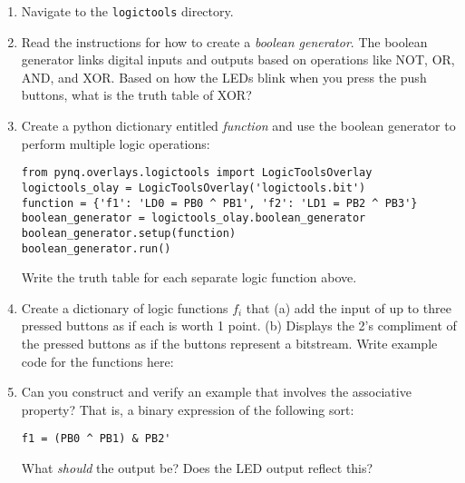 \documentclass{article}
\begin{document}
\begin{enumerate}
\item Navigate to the \verb+logictools+ directory.
\item Read the instructions for how to create a \textit{boolean generator}.  The boolean generator links digital inputs and outputs based on operations like NOT, OR, AND, and XOR.  Based on how the LEDs blink when you press the push buttons, what is the truth table of XOR? \\ \vspace{2cm}
\item Create a python dictionary entitled \textit{function} and use the boolean generator to perform multiple logic operations:
\begin{verbatim}
from pynq.overlays.logictools import LogicToolsOverlay
logictools_olay = LogicToolsOverlay('logictools.bit')
function = {'f1': 'LD0 = PB0 ^ PB1', 'f2': 'LD1 = PB2 ^ PB3'}
boolean_generator = logictools_olay.boolean_generator
boolean_generator.setup(function)
boolean_generator.run()
\end{verbatim}
Write the truth table for each separate logic function above. \\ \vspace{1.5cm}
\item Create a dictionary of logic functions $f_i$ that (a) add the input of up to three pressed buttons as if each is worth 1 point.  (b) Displays the 2's compliment of the pressed buttons as if the buttons represent a bitstream. Write example code for the functions here: \\ \vspace{1.5cm}
\item Can you construct and verify an example that involves the associative property?  That is, a binary expression of the following sort:
\begin{verbatim}
f1 = (PB0 ^ PB1) & PB2'
\end{verbatim}
What \textit{should} the output be?  Does the LED output reflect this? 
\end{enumerate}
\end{document}
